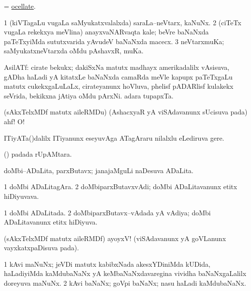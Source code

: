 \bentry
{}
\gl{\gu}
\bmng
= \hyperlink{ocellate}{ocellate}. 
\emng
\eentry

\bentry
{}
\gl{\nA}
\bmng
\bnum
\num{1} (kiVTagaLu \mo vugaLa saMyukatxvalalxda) saraLa--neVtarx, kaNuNx. 
\num{2} (ciTeTx \mo vugaLa rekekxya meVlina) anayxvaNARvaqta kale; beVre baNaNxda paTeTxyiMda sututxvarida yAvudeV baNaNxda macecx. 
\num{3} neVtarxmuKa; saMyukatxneVtarxda oMdu pAshavxR, muKa. 
\enum
\emng
\eentry

\bentry
{}
\gl{\nA}
\bmng
AsilATf: 
\banum
{} cirate bekukx; dakiSxNa matutx madhayx amerikadalilx vAsisuva, gADha haLadi yA kitatxLe baNaNxda camaRda meVle kapupx paTeTxgaLu matutx cukekxgaLuLaLx, cirateyanunx hoVluva, phelisf pADARlisf kulakekx seVrida, bekikxna jAtiya oMdu pArxNi.  
 adara tupapxTa. 
\eanum
\emng
\eentry

\bentry
{}
\gl{\BAavayx}
\bmng
(sAkxTelxMDf matutx aileRMDu) (AshacxyaR yA viSAdavanunx sUcisuva pada) ahf! O! 
\emng
\eentry

\bentry
{}
\gl{\nA}
\bmng
ITiyATa()dalilx ITiyanunx eseyuvAga ATagAraru nilalxlu eLediruva gere. 
\emng
\eentry

\bentry
{}
\gl{\nA}
\bmng
(\ame)  padada rUpAMtara. 
\emng
\eentry

\bentry
{}
\gl{\nA}
\bmng
doMbi--ADaLita, parxButavx; janajaMguLi naDesuva ADaLita. 
\emng
\eentry

\bentry
{}
\gl{\nA}
\bmng
\bnum
\num{1} doMbi ADaLitagAra. 
\num{2} doMbiparxButavxvAdi; doMbi ADaLitavanunx etitx hiDiyuvava. 
\enum
\emng
\eentry

\bentry
{}
\gl{\gu}
\bmng
\bnum
\num{1} doMbi ADaLitada. 
\num{2} doMbiparxButavx--vAdada yA vAdiya; doMbi ADaLitavanunx etitx hiDiyuva. 
\enum
\emng
\eentry

\bentry
{}
\gl{\BAavayx}
\bmng
(sAkxTelxMDf matutx aileRMDf) ayoyxV! (viSAdavanunx yA goVLanunx vayxkatxpaDisuva pada). 
\emng
\eentry

\bentry
{}
\gl{\nA}
\bmng
\bnum
\num{1} kAvi maNuNx; jeVDi matutx kabibxNada akesxYDiniMda kUDida, haLadiyiMda kaMdubaNaNx yA keMbaNaNxdavaregina vividha baNaNxgaLalilx doreyuva maNuNx. 
\num{2} kAvi baNaNx; goVpi baNaNx; nasu haLadi kaMdubaNaNx. 
\enum
\emng
\eentry

